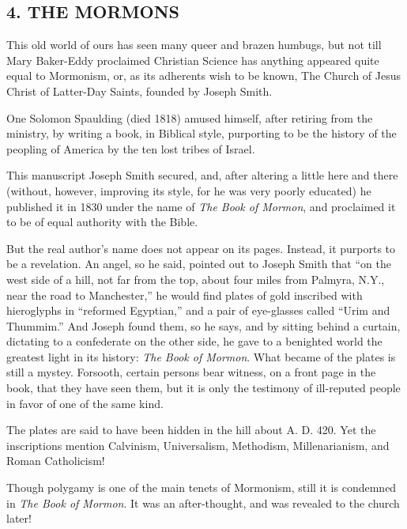 \documentclass[
]{book}
\begin{document}
\hypertarget{the-mormons}{%
\subsection*{\texorpdfstring{4. THE MORMONS}{4. THE MORMONS}}\label{the-mormons}}

This old world of ours has seen many queer and brazen humbugs, but not till Mary Baker-Eddy proclaimed Christian Science has anything appeared quite equal to Mormonism, or, as its adherents wish to be known, The Church of Jesus Christ of Latter-Day Saints, founded by Joseph Smith.

One Solomon Spaulding (died 1818) amused himself, after retiring from the ministry, by writing a book, in Biblical style, purporting to be the history of the peopling of America by the ten lost tribes of Israel.

This manuscript Joseph Smith secured, and, after altering a little here and there (without, however, improving its style, for he was very poorly educated) he published it in 1830 under the name of \emph{The Book of Mormon}, and proclaimed it to be of equal authority with the Bible.

But the real author's name does not appear on its pages. Instead, it purports to be a revelation. An angel, so he said, pointed out to Joseph Smith that ``on the west side of a hill, not far from the top, about four miles from Palmyra, N.Y., near the road to Manchester,'' he would find plates of gold inscribed with hieroglyphs in ``reformed Egyptian,'' and a pair of eye-glasses called ``Urim and Thummim.'' And Joseph found them, so he says, and by sitting behind a curtain, dictating to a confederate on the other side, he gave to a benighted world the greatest light in its history: \emph{The Book of Mormon}. What became of the plates is still a mystey. Forsooth, certain persons bear witness, on a front page in the book, that they have seen them, but it is only the testimony of ill-reputed people in favor of one of the same kind.

The plates are said to have been hidden in the hill about A. D. 420. Yet the inscriptions mention Calvinism, Universalism, Methodism, Millenarianism, and Roman Catholicism!

Though polygamy is one of the main tenets of Mormonism, still it is condemned in \emph{The Book of Mormon}. It was an after-thought, and was revealed to the church later!
\end{document}
